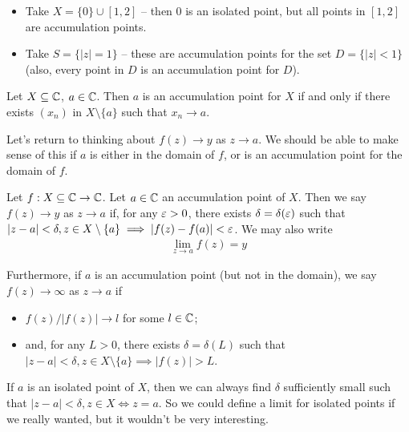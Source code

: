\documentclass{../../template/note}
\begin{document}
    \begin{example}
        \begin{itemize}
            \item Take \(X = \{0\} \cup [1, 2]\) -- then 0 is an isolated point, but all points in \([1, 2]\) are accumulation points.
            \item Take \(S = \{|z| = 1\}\) -- these are accumulation points for the set \(D = \{|z| < 1\}\) (also, every point in \(D\) is an accumulation point for \(D\)).
        \end{itemize}
    \end{example}
    
    \begin{lemma}
        Let \(X \subseteq \mathbb C\), \(a \in \mathbb C\). Then \(a\) is an accumulation point for \(X\) if and only if there exists \((x_n)\) in \(X \setminus \{a\}\) such that \(x_n \to a\).
    \end{lemma}
    
    Let's return to thinking about \(f(z) \to y\) as \(z \to a\). We should be able to make sense of this if \(a\) is either in the domain of \(f\), or is an accumulation point for the domain of \(f\).
    
    \begin{definition}
        Let \(f: X \subseteq \mathbb C \to \mathbb C\). Let \(a \in \mathbb C\) an accumulation point of \(X\). Then we say \(f(z) \to y\) as \(z \to a\) if, for any \(\varepsilon > 0\), there exists \(\delta = \delta(\varepsilon)\) such that \(|z-a| < \delta, z \in X \setminus \{a\} \implies |f(z)-f(a)| < \varepsilon\). We may also write
        \begin{align*}
            \lim_{z \to a}f(z) = y
        \end{align*}

        Furthermore, if \(a\) is an accumulation point (but not in the domain), we say \(f(z) \to \infty\) as \(z \to a\) if
        \begin{itemize}
            \item \(f(z)/|f(z)| \to l\) for some \(l \in \mathbb C\);
            \item and, for any \(L > 0\), there exists \(\delta = \delta(L)\) such that \(|z-a| < \delta, z \in X \setminus \{a\} \implies |f(z)| > L\).
        \end{itemize}
    \end{definition}
    
    \begin{remark}
        If \(a\) is an isolated point of \(X\), then we can always find \(\delta\) sufficiently small such that \(|z-a| < \delta, z \in X \iff z = a\). So we could define a limit for isolated points if we really wanted, but it wouldn't be very interesting.
    \end{remark}
    
\end{document}
